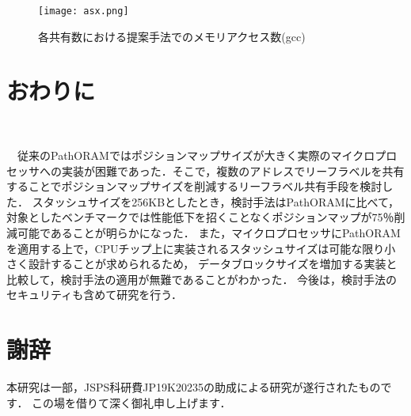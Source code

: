\documentclass{jarticle}
\begin{document}


\begin{figure}[t]
  \texttt{[image: asx.png]}
  \caption{各共有数における提案手法でのメモリアクセス数(gcc)}
  \label{gccres}
\end{figure}



\section{おわりに}




　従来のPathORAMではポジションマップサイズが大きく実際のマイクロプロセッサへの実装が困難であった．そこで，複数のアドレスでリーフラベルを共有することでポジションマップサイズを削減するリーフラベル共有手段を検討した．
スタッシュサイズを256KBとしたとき，検討手法はPathORAMに比べて，
対象としたベンチマークでは性能低下を招くことなくポジションマップが75％削減可能であることが明らかになった．
また，マイクロプロセッサにPathORAMを適用する上で，CPUチップ上に実装されるスタッシュサイズは可能な限り小さく設計することが求められるため，
データブロックサイズを増加する実装と比較して，検討手法の適用が無難であることがわかった．
今後は，検討手法のセキュリティも含めて研究を行う．

\section{謝辞}
本研究は一部，JSPS科研費JP19K20235の助成による研究が遂行されたものです．
この場を借りて深く御礼申し上げます．
\end{document}
